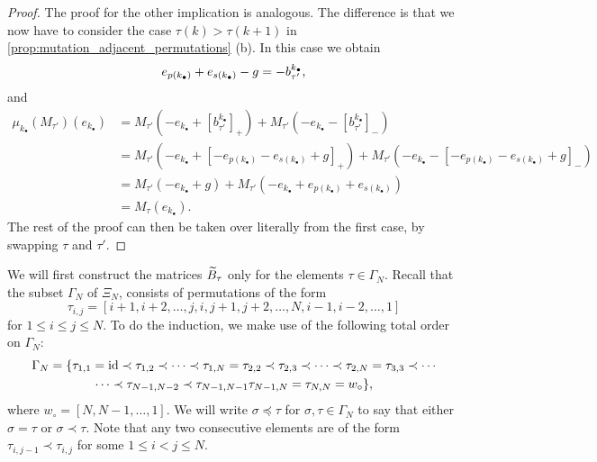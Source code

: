 \begin{proof}
	The proof for the other implication is analogous. The difference is that we now have to
	consider the case $\tau(k) > \tau(k+1)$ in \cref{prop:mutation_adjacent_permutations}
	(b). In this case we obtain
	\begin{equation*}
		e_{p(k_\bullet)} + e_{s(k_\bullet)} - g = - b^{k_\bullet}_{\tau'},
	\end{equation*}
	and
	\begin{align*}
		\mu_{k_\bullet}(M_{\tau'})(e_{k_\bullet})
		 & = M_{\tau'}(-e_{k_\bullet} + [b^{k_\bullet}_{\tau'}]_{+}) + M_{\tau'}(-e_{k_\bullet} - [b^{k_\bullet}_{\tau'}]_{-})                                       \\
		 & = M_{\tau'}(-e_{k_\bullet} + [-e_{p(k_\bullet)} - e_{s(k_\bullet)} + g]_{+}) + M_{\tau'}(-e_{k_\bullet} - [-e_{p(k_\bullet)} - e_{s(k_\bullet)} + g]_{-}) \\
		 & = M_{\tau'}(-e_{k_\bullet} + g) + M_{\tau'}(-e_{k_\bullet} + e_{p(k_\bullet)} + e_{s(k_\bullet)})                                                         \\
		 & = M_{\tau}(e_{k_\bullet}).
	\end{align*}
	The rest of the proof can then be taken over literally from the first case, by swapping
	$\tau$ and $\tau'$.

\end{proof}

We will first construct the matrices $\widetilde{B}_\tau$ only for the elements $\tau \in
	\Gamma_N$. Recall that the subset $\Gamma_N$ of $\Xi_N$,
consists of permutations of the form
\begin{equation*}
	\tau_{i, j} = [i+1, i+2, \dots, j, i , j+1, j+2, \dots, N, i-1, i-2, \dots, 1]
\end{equation*}
%
for $1 \leq i \leq j \leq N$. To do the induction, we make use of the following total
order on $\Gamma_N$:
\begin{multline*}
	\Gamma_N = \{\tau_{1,1} = \operatorname{id} \prec \tau_{1,2} \prec \cdots \prec \tau_{1, N} = \tau_{2,2} \prec \tau_{2,3} \prec \cdots \prec \tau_{2,N} = \tau_{3,3} \prec \cdots\\ \cdots \prec \tau_{N-1, N-2} \prec \tau_{N-1, N-1} \tau_{N-1, N} = \tau_{N, N} = w_\circ \},
\end{multline*}
%
where $w_\circ = [N, N-1, \dots, 1]$. We will write $\sigma \preceq \tau$ for $\sigma,
	\tau \in \Gamma_N$ to say that either $\sigma = \tau$ or $\sigma \prec \tau$. Note that
any two consecutive elements are of the form $\tau_{i, j-1} \prec \tau_{i, j}$ for some
$1 \leq i < j \leq N$.

